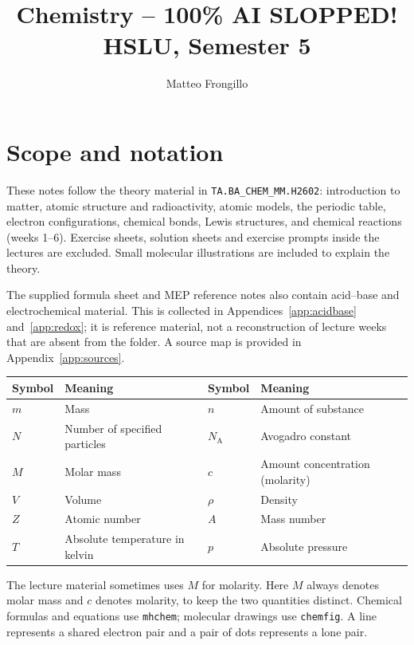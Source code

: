 \documentclass[a4paper,10pt]{article}
\title{\textbf{Chemistry -- 100\% AI SLOPPED!\\ HSLU, Semester 5}}
\author{Matteo Frongillo}
\date{}
\newcommand{\chapterbreak}{\clearpage}
\begin{document}
\begingroup
\setlength{\tabcolsep}{0pt}
\maketitle
\endgroup
\tableofcontents
\chapterbreak

\section*{Scope and notation}
These notes follow the theory material in \texttt{TA.BA\_CHEM\_MM.H2602}:
introduction to matter, atomic structure and radioactivity, atomic models,
the periodic table, electron configurations, chemical bonds, Lewis structures,
and chemical reactions (weeks 1--6). Exercise sheets, solution sheets and
exercise prompts inside the lectures are excluded. Small molecular illustrations
are included to explain the theory.

The supplied formula sheet and MEP reference notes also contain acid--base
and electrochemical material. This is collected in
Appendices~\ref{app:acidbase} and~\ref{app:redox}; it is reference material,
not a reconstruction of lecture weeks that are absent from the folder.
A source map is provided in Appendix~\ref{app:sources}.

\begin{tabularx}{\linewidth}{@{}lLlL@{}}
\toprule
Symbol & Meaning & Symbol & Meaning \\
\midrule
$m$ & Mass & $n$ & Amount of substance \\
$N$ & Number of specified particles & $N_{\mathrm A}$ & Avogadro constant \\
$M$ & Molar mass & $c$ & Amount concentration (molarity) \\
$V$ & Volume & $\rho$ & Density \\
$Z$ & Atomic number & $A$ & Mass number \\
$T$ & Absolute temperature in kelvin & $p$ & Absolute pressure \\
\bottomrule
\end{tabularx}

The lecture material sometimes uses $M$ for molarity. Here $M$ always denotes
molar mass and $c$ denotes molarity, to keep the two quantities distinct.
Chemical formulas and equations use \texttt{mhchem}; molecular drawings use
\texttt{chemfig}. A line represents a shared electron pair and a pair of dots
represents a lone pair.
\end{document}
